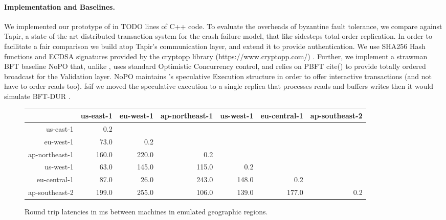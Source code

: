 \paragraph{Implementation and Baselines.} We implemented our prototype of \sys in TODO lines of C++ code. To evaluate the overheads of byzantine fault tolerance, we compare against Tapir\cite{zhang2015tapir}, a state of the art distributed transaction system for the crash failure model, that like \sys sidesteps total-order replication. In order to facilitate a fair comparison we build \sys atop Tapir's communication layer, and extend it to provide authentication. We use SHA256 Hash functions and ECDSA signatures provided by the cryptopp library (https://www.cryptopp.com/)  . Further, we implement a strawman BFT baseline NoPO that, unlike \sys, uses standard Optimistic Concurrency control, and relies on PBFT cite() to provide totally ordered broadcast for the Validation layer.  NoPO maintains \sys 's speculative Execution structure in order to offer interactive transactions (and not have to order reads too). fs{if we moved the speculative execution to a single replica that processes reads and buffers writes then it would simulate BFT-DUR }. 

\begin{figure}[t]
\centering
\begin{tabular}{r  r  r  r  r  r  r}
  \multicolumn{1}{r|}{} & us-east-1 &  eu-west-1 &  ap-northeast-1 &  us-west-1 &  eu-central-1 & ap-southeast-2 \\
  \hline
  \multicolumn{1}{r|}{us-east-1}      &   0.2 \\
  \multicolumn{1}{r|}{eu-west-1}      &  73.0 &   0.2 \\
  \multicolumn{1}{r|}{ap-northeast-1} & 160.0 & 220.0 &   0.2 \\
  \multicolumn{1}{r|}{us-west-1}      &  63.0 & 145.0 & 115.0 &   0.2 \\
  \multicolumn{1}{r|}{eu-central-1}   &  87.0 &  26.0 & 243.0 & 148.0 & 0.2 \\
  \multicolumn{1}{r|}{ap-southeast-2} & 199.0 & 255.0 & 106.0 & 139.0 & 177.0 & 0.2 \\
\end{tabular}
\caption{Round trip latencies in ms between machines in emulated geographic
  regions.}
\label{tab:latencies}
\end{figure}

